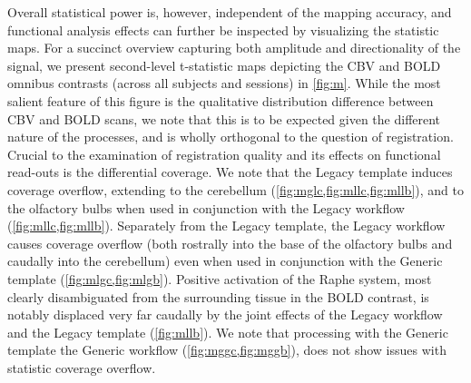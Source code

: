 Overall statistical power is, however, independent of the mapping accuracy, and functional analysis effects can further be inspected by visualizing the statistic maps.
For a succinct overview capturing both amplitude and directionality of the signal, we present second-level t-statistic maps depicting the CBV and BOLD omnibus contrasts (across all subjects and sessions) in \cref{fig:m}.
While the most salient feature of this figure is the qualitative distribution difference between CBV and BOLD scans, we note that this is to be expected given the different nature of the processes, and is wholly orthogonal to the question of registration.
Crucial to the examination of registration quality and its effects on functional read-outs is the differential coverage.
We note that the Legacy template induces coverage overflow, extending to the cerebellum (\cref{fig:mglc,fig:mllc,fig:mllb}), and to the olfactory bulbs when used in conjunction with the Legacy workflow (\cref{fig:mllc,fig:mllb}).
Separately from the Legacy template, the Legacy workflow causes coverage overflow (both rostrally into the base of the olfactory bulbs and caudally into the cerebellum) even when used in conjunction with the Generic template (\cref{fig:mlgc,fig:mlgb}).
Positive activation of the Raphe system, most clearly disambiguated from the surrounding tissue in the BOLD contrast, is notably displaced very far caudally by the joint effects of the Legacy workflow and the Legacy template (\cref{fig:mllb}).
We note that processing with the Generic template the Generic workflow (\cref{fig:mggc,fig:mggb}), does not show issues with statistic coverage overflow.

